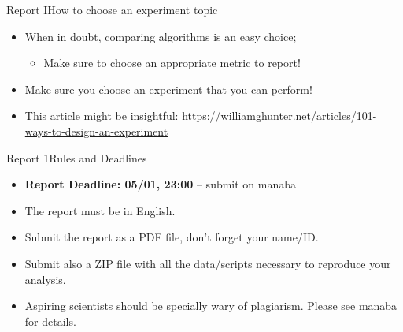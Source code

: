 \documentclass[aspectratio=169]{beamer}
\begin{document}
\begin{CJK}{UTF8}{ipxm}
\begin{frame}{Report I}{How to choose an experiment topic}
\begin{itemize}
    \item When in doubt, comparing algorithms is an easy choice;
    \begin{itemize}
      \item Make sure to choose an appropriate metric to report!
    \end{itemize}
    \medskip

    \item Make sure you choose an experiment that you can perform!
    \bigskip

    \item This article might be insightful: \url{https://williamghunter.net/articles/101-ways-to-design-an-experiment}
  \end{itemize}
\end{frame}

\begin{frame}[t]{Report 1}{Rules and Deadlines}
  \begin{itemize}
    \item {\bf Report Deadline: 05/01, 23:00} -- submit on manaba\bigskip

    \item The report must be in English.\bigskip

    \item Submit the report as a PDF file, don't forget your name/ID.
    \item Submit also a ZIP file with all the data/scripts necessary to reproduce your analysis.
    \bigskip

  \item \alert{Aspiring scientists should be specially wary of
      plagiarism. Please see manaba for details.}
  \end{itemize}

\end{frame}



\end{CJK}
\end{document}
